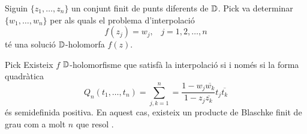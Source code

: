\documentclass[dvipsnames, svgnames, leqno, a4paper, 12pt]{report}
\begin{document}
Siguin $\{z_1,\dots,z_n\}$ un conjunt finit de punts diferents de $\mathbb{D}$. Pick va determinar  $\{w_1,\dots,w_n\}$ per als quals el problema d'interpolació
\begin{equation}\label{eq:interpol}
    f(z_j)=w_j,\, \text{  } j=1,2,\dots,n
\end{equation}
té una solució $\mathbb{D}$-holomorfa $f(z)$.
\begin{theorem}{Pick}
    Existeix $f$ $\mathbb{D}$-holomorfisme que satisfà la interpolació \normalfont{(\ref{eq:interpol})} si i només si la forma quadràtica \begin{displaymath}
        Q_n(t_1,\dots,t_n)=\sum_{j,k=1}^n=\frac{1-w_j\overline{w_k}}{1-z_j\overline{z_k}}t_j\overline{t_k}
    \end{displaymath}
    és semidefinida positiva. En aquest cas, existeix un producte de Blaschke finit de grau com a molt $n$ que resol \normalfont{(\ref{eq:interpol})}.
\end{theorem}
\end{document}
